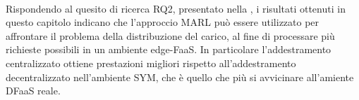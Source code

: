 \paragraph{} Rispondendo al quesito di ricerca RQ2, presentato nella , i risultati ottenuti in questo capitolo indicano che l'approccio MARL può essere utilizzato per affrontare il problema della distribuzione del carico, al fine di processare più richieste possibili in un ambiente edge-FaaS. In particolare l'addestramento centralizzato ottiene prestazioni migliori rispetto all'addestramento decentralizzato nell'ambiente SYM, che è quello che più si avvicinare all'amiente DFaaS reale.